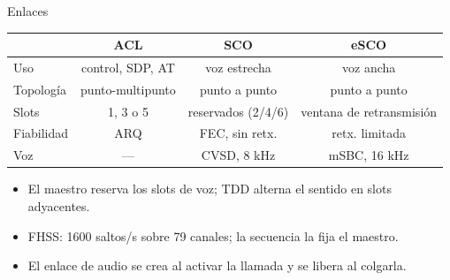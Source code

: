 \documentclass[aspectratio=169,10pt]{beamer}
\begin{document}
\begin{frame}{Enlaces}
  \centering
  \scriptsize
  \begin{tabular}{@{}lccc@{}}
    \toprule
    & \textbf{ACL} & \textbf{SCO} & \textbf{eSCO} \\
    \midrule
    Uso & control, SDP, AT & voz estrecha & voz ancha \\
    Topología & punto-multipunto & punto a punto & punto a punto \\
    Slots & 1, 3 o 5 & reservados (2/4/6) & ventana de retransmisión \\
    Fiabilidad & ARQ & FEC, sin retx. & retx. limitada \\
    Voz & --- & CVSD, 8 kHz & mSBC, 16 kHz \\
    \bottomrule
  \end{tabular}
  \vspace{4mm}
  \begin{itemize}
    \item El maestro reserva los slots de voz; TDD alterna el sentido en slots adyacentes.
    \item FHSS: 1600 saltos/s sobre 79 canales; la secuencia la fija el maestro.
    \item El enlace de audio se crea al activar la llamada y se libera al colgarla.
  \end{itemize}
\end{frame}
\end{document}
